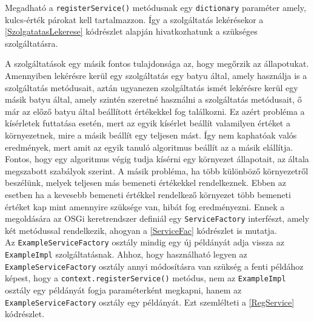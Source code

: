 %


Megadható a \texttt{registerService()} metódusnak egy \texttt{dictionary} paraméter amely, kulcs-érték párokat kell tartalmazzon. Így a szolgáltatás lekérésekor a \ref{SzolgatatasLekerese} kódrészlet alapján hivatkozhatunk a szükséges szolgáltatásra.

%



A szolgáltatások egy másik fontos tulajdonsága az, hogy megőrzik az állapotukat. Amennyiben lekérésre kerül egy szolgáltatás egy batyu által, amely használja is a szolgáltatás metódusait, aztán ugyanezen szolgáltatás ismét lekérésre kerül egy másik batyu által, amely szintén szeretné használni a szolgáltatás metódusait, ő már az előző batyu által beállított értékekkel fog találkozni. Ez azért probléma a kísérletek futtatása esetén, mert az egyik kísérlet beállít valamilyen értéket a környezetnek, mire a másik beállít egy teljesen mást. Így nem kaphatóak valós eredmények, mert amit az egyik tanuló algoritmus beállít az a másik elállítja. Fontos, hogy egy algoritmus végig tudja kísérni egy környezet állapotait, az általa megszabott szabályok szerint. A másik probléma, ha több különböző környezetről beszélünk, melyek teljesen más bemeneti értékekkel rendelkeznek. Ebben az esetben ha a kevesebb bemeneti értékkel rendelkező környezet több bemeneti értéket kap mint amennyire szüksége van, hibát fog eredményezni. Ennek a megoldására az OSGi keretrendszer definiál egy \texttt{ServiceFactory} interfészt, amely két metódussal rendelkezik, ahogyan a \ref{ServiceFac} kódrészlet is mutatja.
\\
%


Az \texttt{ExampleServiceFactory} osztály mindig egy új példányát adja vissza az \texttt{ExampleImpl} szolgáltatásnak. Ahhoz, hogy használható legyen az \texttt{ExampleServiceFactory} osztály annyi módosításra van szükség a fenti példához képest, hogy a \texttt{context.registerService()} metódus, nem az \texttt{ExampleImpl} osztály egy példányát fogja paraméterként megkapni, hanem az \texttt{ExampleServiceFactory} osztály egy példányát. Ezt szemlélteti a \ref{RegService} kódrészlet.

